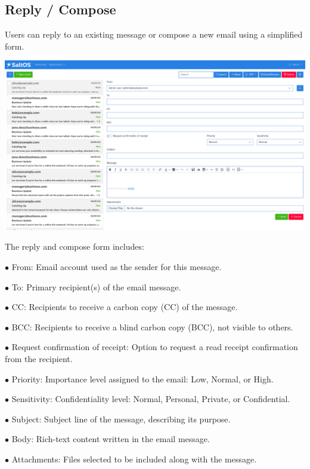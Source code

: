 \documentclass[a4paper]{article}
\begin{document}
\hypertarget{toc94}{}
\subsection{Reply / Compose}

Users can reply to an existing message or compose a new email using a simplified form.

\begin{center}\includegraphics[width=1\textwidth]{../ujest/snaps/test-screenshots-js-screenshots-emails-emails-create-en-us-1-snap.png}\end{center}

The reply and compose form includes:

\begin{compactitem}
\item[\color{myblue}$\bullet$] From: Email account used as the sender for this message.
\item[\color{myblue}$\bullet$] To: Primary recipient(s) of the email message.
\item[\color{myblue}$\bullet$] CC: Recipients to receive a carbon copy (CC) of the message.
\item[\color{myblue}$\bullet$] BCC: Recipients to receive a blind carbon copy (BCC), not visible to others.
\item[\color{myblue}$\bullet$] Request confirmation of receipt: Option to request a read receipt confirmation from the recipient.
\item[\color{myblue}$\bullet$] Priority: Importance level assigned to the email: Low, Normal, or High.
\item[\color{myblue}$\bullet$] Sensitivity: Confidentiality level: Normal, Personal, Private, or Confidential.
\item[\color{myblue}$\bullet$] Subject: Subject line of the message, describing its purpose.
\item[\color{myblue}$\bullet$] Body: Rich-text content written in the email message.
\item[\color{myblue}$\bullet$] Attachments: Files selected to be included along with the message.
\end{compactitem}
\end{document}
